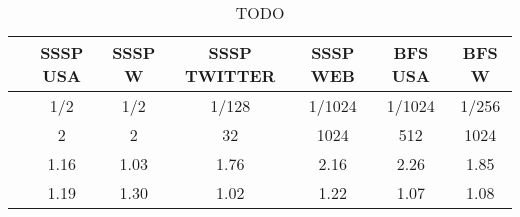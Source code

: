 \begin{table}[h]
\centring
\begin{tabular}{ |c|c|c|c|c|c|c| }
\hline
 & \large{\textbf{SSSP USA}} & \large{\textbf{SSSP W}} & \large{\textbf{SSSP TWITTER}} & \large{\textbf{SSSP WEB}} & \large{\textbf{BFS USA}} & \large{\textbf{BFS W}} \\
\hline
\insprob{} & 1/2 & 1/2 & 1/128 & 1/1024 & 1/1024 & 1/256 \\
\hline
\delbatch{} & 2 & 2 & 32 & 1024 & 512 & 1024 \\
\hline
\speed{} & 1.16 & 1.03 & 1.76 & 2.16 & 2.26 & 1.85 \\
\hline
\workinc{} & 1.19 & 1.30 & 1.02 & 1.22 & 1.07 & 1.08 \\
\hline
\end{tabular}
\vspace{0.3em}
\caption{TODO }
\label{table:todo}
\end{table}
